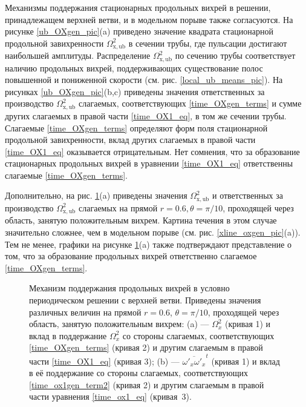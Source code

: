 Механизмы поддержания стационарных продольных вихрей в решении, принадлежащем верхней ветви, и в модельном порыве также согласуются. На рисунке \ref{ub_OXgen_pic}(a) приведено значение квадрата стационарной продольной завихренности $\Omega_\mathrm{x, ub}^2$ в сечении трубы, где пульсации достигают наибольшей амплитуды. Распределение $\Omega_\mathrm{x,ub}^2$ по сечению трубы соответствует наличию продольных вихрей, поддерживающих существование полос повышенной и пониженной скорости (см. рис. \ref{local_ub_means_pic}). На рисунках \ref{ub_OXgen_pic}(b,c) приведены значения ответственных за производство $\Omega_\mathrm{x,ub}^2$ слагаемых, соответствующих \eqref{time_OXgen_terms} и сумме других слагаемых в правой части \eqref{time_OX1_eq}, в том же сечении трубы. Слагаемые \eqref{time_OXgen_terms} определяют форм поля стационарной продольной завихренности, вклад других слагаемых в правой части \eqref{time_OX1_eq} оказывается отрицательным. Нет сомнения, что за образование стационарных продольных вихрей в уравнении \eqref{time_OX1_eq} ответственны слагаемые \eqref{time_OXgen_terms}. 

Дополнительно, на рис. \ref{ub_oxgen_lines_pic}(a) приведены значения $\Omega_\mathrm{x, ub}^2$ и ответственных за производство $\Omega_\mathrm{x, ub}^2$ слагаемых на прямой $r = 0.6, \theta = \pi/10$, проходящей через область, занятую положительным вихрем. Картина течения в этом случае значительно сложнее, чем в модельном порыве (см. рис. \ref{xline_oxgen_pic}(a)). Тем не менее, графики на рисунке \ref{ub_oxgen_lines_pic}(a) также подтверждают представление о том, что за образование продольных вихрей ответственно слагаемое \eqref{time_OXgen_terms}. 
 

\begin{figure}
\caption{Механизм поддержания продольных вихрей в условно периодическом решении с верхней ветви. Приведены значения различных величин на прямой $r = 0.6$, $\theta = \pi/10$, проходящей через область, занятую положительным вихрем: (a) --- $\Omega_x^2$ (кривая 1) и вклад в поддержание $\Omega_x^2$ со стороны слагаемых, соответствующих \eqref{time_OXgen_terms} (кривая 2) и другим слагаемым в правой части \eqref{time_OX1_eq} (кривая 3); (b) --- $\overline{\omega'_x\omega'_x}^t$ (кривая 1) и вклад в её поддержание со стороны слагаемых, соответствующих \eqref{time_ox1gen_term2} (кривая 2) и другим слагаемым в правой части уравнения \eqref{time_ox1_eq} (кривая~3).} 
\label{ub_oxgen_lines_pic}
\end{figure}


